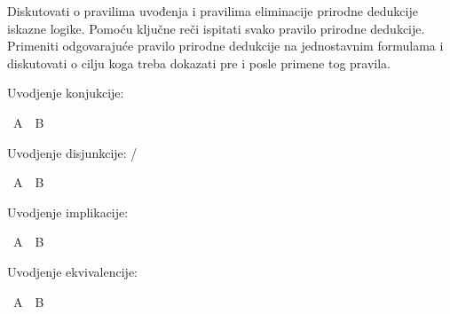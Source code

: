 %
\begin{isabellebody}%
%
%
\isadelimtheory
%
\endisadelimtheory
%
\isatagtheory
%
\endisatagtheory
{\isafoldtheory}%
%
\isadelimtheory
%
\endisadelimtheory
%
\begin{exercise}[subtitle=Intuicionistička pravila prirodne dedukcije u iskaznoj logici]
%
\begin{isamarkuptext}%
Diskutovati o pravilima uvođenja i pravilima eliminacije prirodne dedukcije iskazne logike.
      Pomoću ključne reči  ispitati svako pravilo prirodne dedukcije. Primeniti 
      odgovarajuće pravilo prirodne dedukcije na jednostavnim formulama i diskutovati o cilju
      koga treba dokazati pre i posle primene tog pravila.%
\end{isamarkuptext}\isamarkuptrue%
%
\begin{isamarkuptext}%
Uvodjenje konjukcije: %
\end{isamarkuptext}\isamarkuptrue%
\isamarkupfalse%
\ {\isachardoublequoteopen}A\ {\isasymand}\ B{\isachardoublequoteclose}\isanewline
\ \ %
\isadelimproof
%
\endisadelimproof
%
\isatagproof
%
\endisatagproof
{\isafoldproof}%
%
\isadelimproof
%
\endisadelimproof
%
\begin{isamarkuptext}%
Uvodjenje disjunkcije: /%
\end{isamarkuptext}\isamarkuptrue%
\isamarkupfalse%
\ {\isachardoublequoteopen}A\ {\isasymor}\ B{\isachardoublequoteclose}\isanewline
\ \ %
\isadelimproof
%
\endisadelimproof
%
\isatagproof
%
\endisatagproof
{\isafoldproof}%
%
\isadelimproof
%
\endisadelimproof
%
\begin{isamarkuptext}%
Uvodjenje implikacije: %
\end{isamarkuptext}\isamarkuptrue%
\isamarkupfalse%
\ {\isachardoublequoteopen}A\ {\isasymlongrightarrow}\ B{\isachardoublequoteclose}\isanewline
\ \ %
\isadelimproof
%
\endisadelimproof
%
\isatagproof
%
\endisatagproof
{\isafoldproof}%
%
\isadelimproof
%
\endisadelimproof
%
\begin{isamarkuptext}%
Uvodjenje ekvivalencije: %
\end{isamarkuptext}\isamarkuptrue%
\isamarkupfalse%
\ {\isachardoublequoteopen}A\ {\isasymlongleftrightarrow}\ B{\isachardoublequoteclose}\isanewline
\ \ %
\isadelimproof
%
\endisadelimproof
%
\isatagproof
%
\endisatagproof
{\isafoldproof}%
%
\isadelimproof
%
\endisadelimproof
%
\begin{isamarkuptext}%

\end{isamarkuptext}
\end{exercise}
\end{isabellebody}
